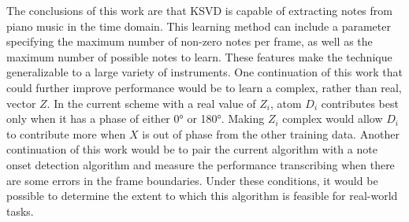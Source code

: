 The conclusions of this work are that \ac{KSVD} is capable of extracting notes from piano music in the time domain. This learning method can include a parameter specifying the maximum number of non-zero notes per frame, as well as the maximum number of possible notes to learn. These features make the technique generalizable to a large variety of instruments. One continuation of this work that could further improve performance would be to learn a complex, rather than real, vector $Z$. In the current scheme with a real value of $Z_i$, atom $D_i$ contributes best only when it has a phase of either \ang{0} or \ang{180}. Making $Z_i$ complex would allow $D_i$ to contribute more when $X$ is out of phase from the other training data. Another continuation of this work would be to pair the current algorithm with a note onset detection algorithm and measure the performance transcribing when there are some errors in the frame boundaries. Under these conditions, it would be possible to determine the extent to which this algorithm is feasible for real-world tasks.
